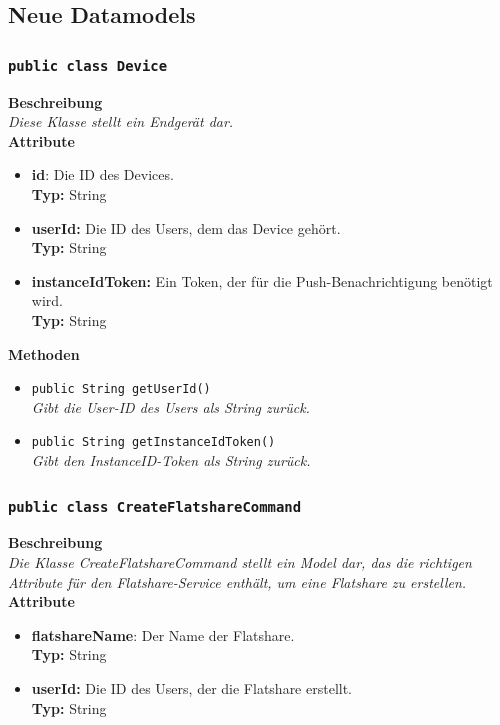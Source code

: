 \documentclass[a4paper]{scrreprt}
\begin{document}
	\subsection{Neue Datamodels}
	\subsubsection{\texttt{public class Device}}
	\textbf{Beschreibung} \\
	\textit{Diese Klasse stellt ein Endgerät dar.} \\
	
	\textbf{Attribute}
	\begin{itemize}
		\item \textbf{id}: Die ID des Devices. \\
		\textbf{Typ:} String
		
		\item \textbf{userId:} Die ID des Users, dem das Device gehört. \\
		\textbf{Typ:} String
		
		\item \textbf{instanceIdToken:} Ein Token, der für die Push-Benachrichtigung benötigt wird.\\
		\textbf{Typ:} String
	\end{itemize}
	
	\textbf{Methoden}
	\begin{itemize}
		\item{\texttt{public String getUserId()}}\\
		\textit{Gibt die User-ID des Users als String zurück.}\\
		\item{\texttt{public String getInstanceIdToken()}}\\
		\textit{Gibt den InstanceID-Token als String zurück.}\\
	\end{itemize}
	\subsubsection{\texttt{public class CreateFlatshareCommand}}
	\textbf{Beschreibung} \\
	\textit{Die Klasse CreateFlatshareCommand stellt ein Model dar, das die richtigen Attribute für den Flatshare-Service enthält, um eine Flatshare zu erstellen.} \\
	
	\textbf{Attribute}
	\begin{itemize}
		\item \textbf{flatshareName}: Der Name der Flatshare. \\
		\textbf{Typ:} String
		
		\item \textbf{userId:} Die ID des Users, der die Flatshare erstellt. \\
		\textbf{Typ:} String
	\end{itemize}
	
\end{document}
